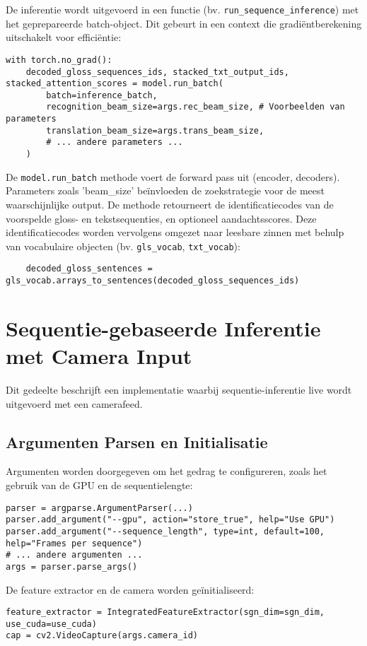 De inferentie wordt uitgevoerd in een functie (bv. \texttt{run\_sequence\_inference}) met het geprepareerde batch-object. 
Dit gebeurt in een context die gradiëntbereken\-ing uitschakelt voor efficiëntie:

\begin{lstlisting}
with torch.no_grad():
    decoded_gloss_sequences_ids, stacked_txt_output_ids, stacked_attention_scores = model.run_batch(
        batch=inference_batch,
        recognition_beam_size=args.rec_beam_size, # Voorbeelden van parameters
        translation_beam_size=args.trans_beam_size,
        # ... andere parameters ...
    )
\end{lstlisting}

De \texttt{model.run\_batch} methode voert de forward pass uit (encoder, decoders). 
Parameters zoals 'beam\_size' beïnvloeden de zoekstrategie voor de meest waarschijnlijke output. 
De methode retourneert de identificatiecodes van de voorspelde gloss- en tekstsequenties, en optioneel aandachtsscores.
Deze identificatiecodes worden vervolgens omgezet naar leesbare zinnen met behulp van vocabulaire objecten (bv. \texttt{gls\_vocab}, \texttt{txt\_vocab}):
\begin{lstlisting}
    decoded_gloss_sentences = gls_vocab.arrays_to_sentences(decoded_gloss_sequences_ids)
\end{lstlisting}

\section{Sequentie-gebaseerde Inferentie met Camera Input}
\label{sec:sequentie-inferentie-camera}

Dit gedeelte beschrijft een implementatie waarbij sequentie-inferentie live wordt uitgevoerd met een camerafeed.

\subsection{Argumenten Parsen en Initialisatie}
\label{sec:main-args-init-latex}

Argumenten worden doorgegeven om het gedrag te configureren, zoals het gebruik van de GPU en de sequentielengte:
\begin{lstlisting}
parser = argparse.ArgumentParser(...)
parser.add_argument("--gpu", action="store_true", help="Use GPU")
parser.add_argument("--sequence_length", type=int, default=100, help="Frames per sequence")
# ... andere argumenten ...
args = parser.parse_args()
\end{lstlisting}
De feature extractor en de camera worden geïnitialiseerd:
\begin{lstlisting}
feature_extractor = IntegratedFeatureExtractor(sgn_dim=sgn_dim, use_cuda=use_cuda)
cap = cv2.VideoCapture(args.camera_id)
\end{lstlisting}

